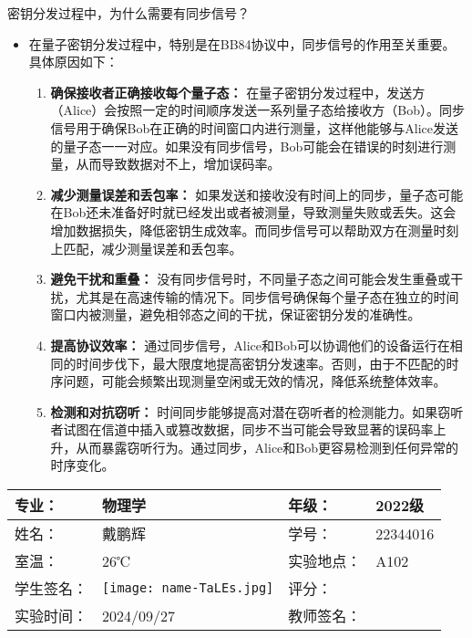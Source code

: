 \documentclass[dvipsnames, svgnames,a4paper,11pt]{article}
\begin{document}
\begin{question}
	密钥分发过程中，为什么需要有同步信号？
\end{question}

	\begin{itemize}
		\item 在量子密钥分发过程中，特别是在BB84协议中，同步信号的作用至关重要。具体原因如下：
		
		\begin{enumerate}
			\item \textbf{确保接收者正确接收每个量子态：}  
			在量子密钥分发过程中，发送方（Alice）会按照一定的时间顺序发送一系列量子态给接收方（Bob）。同步信号用于确保Bob在正确的时间窗口内进行测量，这样他能够与Alice发送的量子态一一对应。如果没有同步信号，Bob可能会在错误的时刻进行测量，从而导致数据对不上，增加误码率。

			\item \textbf{减少测量误差和丢包率：}  
			如果发送和接收没有时间上的同步，量子态可能在Bob还未准备好时就已经发出或者被测量，导致测量失败或丢失。这会增加数据损失，降低密钥生成效率。而同步信号可以帮助双方在测量时刻上匹配，减少测量误差和丢包率。

			\item \textbf{避免干扰和重叠：}  
			没有同步信号时，不同量子态之间可能会发生重叠或干扰，尤其是在高速传输的情况下。同步信号确保每个量子态在独立的时间窗口内被测量，避免相邻态之间的干扰，保证密钥分发的准确性。

			\item \textbf{提高协议效率：}  
			通过同步信号，Alice和Bob可以协调他们的设备运行在相同的时间步伐下，最大限度地提高密钥分发速率。否则，由于不匹配的时序问题，可能会频繁出现测量空闲或无效的情况，降低系统整体效率。

			\item \textbf{检测和对抗窃听：}  
			时间同步能够提高对潜在窃听者的检测能力。如果窃听者试图在信道中插入或篡改数据，同步不当可能会导致显著的误码率上升，从而暴露窃听行为。通过同步，Alice和Bob更容易检测到任何异常的时序变化。
		\end{enumerate}

	\end{itemize}


\clearpage
\begin{table}
	\renewcommand\arraystretch{1.7}
	\centering
	\begin{tabularx}{\textwidth}{|X|X|X|X|}
	\hline
	专业：& 物理学 &年级：& 2022级 \\
	\hline
	姓名：& 戴鹏辉 & 学号：& 22344016 \\
	\hline
	室温：& 26℃ & 实验地点： & A102 \\
	\hline
	学生签名：& \texttt{[image: name-TaLEs.jpg]} & 评分： &\\
	\hline
	实验时间：& 2024/09/27& 教师签名：&\\
	\hline
	\end{tabularx}
\end{table}
\end{document}
